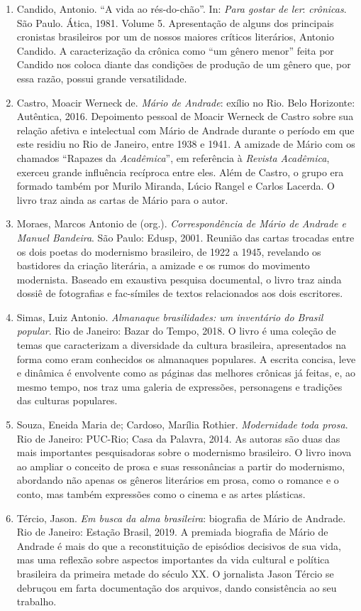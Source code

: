 \documentclass[12pt]{extarticle}
\begin{document}
\begin{enumerate}
\item
  Candido, Antonio. ``A vida ao rés-do-chão''. In: \emph{Para gostar de
  ler}: \emph{crônicas}. São Paulo. Ática, 1981. Volume 5. Apresentação
  de alguns dos principais cronistas brasileiros por um de nossos
  maiores críticos literários, Antonio Candido. A caracterização da
  crônica como ``um gênero menor'' feita por Candido nos coloca diante
  das condições de produção de um gênero que, por essa razão, possui
  grande versatilidade.
\item
  Castro, Moacir Werneck de. \emph{Mário de Andrade}: exílio no Rio.
  Belo Horizonte: Autêntica, 2016. Depoimento pessoal de Moacir Werneck
  de Castro sobre sua relação afetiva e intelectual com Mário de Andrade
  durante o período em que este residiu no Rio de Janeiro, entre 1938 e
  1941. A amizade de Mário com os chamados ``Rapazes da
  \emph{Acadêmica}'', em referência à \emph{Revista Acadêmica}, exerceu
  grande influência recíproca entre eles. Além de Castro, o grupo era
  formado também por Murilo Miranda, Lúcio Rangel e Carlos Lacerda. O
  livro traz ainda as cartas de Mário para o autor.
\item
  Moraes, Marcos Antonio de (org.). \emph{Correspondência de Mário de
  Andrade e Manuel Bandeira}. São Paulo: Edusp, 2001. Reunião das cartas
  trocadas entre os dois poetas do modernismo brasileiro, de 1922 a
  1945, revelando os bastidores da criação literária, a amizade e os
  rumos do movimento modernista. Baseado em exaustiva pesquisa
  documental, o livro traz ainda dossiê de fotografias e fac-símiles de
  textos relacionados aos dois escritores.
\item
  Simas, Luiz Antonio. \emph{Almanaque brasilidades: um inventário do
  Brasil popular}. Rio de Janeiro: Bazar do Tempo, 2018. O livro é uma
  coleção de temas que caracterizam a diversidade da cultura brasileira,
  apresentados na forma como eram conhecidos os almanaques populares. A
  escrita concisa, leve e dinâmica é envolvente como as páginas das
  melhores crônicas já feitas, e, ao mesmo tempo, nos traz uma galeria
  de expressões, personagens e tradições das culturas populares.
\item
  Souza, Eneida Maria de; Cardoso, Marília Rothier. \emph{Modernidade
  toda prosa}. Rio de Janeiro: PUC-Rio; Casa da Palavra, 2014. As
  autoras são duas das mais importantes pesquisadoras sobre o modernismo
  brasileiro. O livro inova ao ampliar o conceito de prosa e suas
  ressonâncias a partir do modernismo, abordando não apenas os gêneros
  literários em prosa, como o romance e o conto, mas também expressões
  como o cinema e as artes plásticas.
\item
  Tércio, Jason. \emph{Em busca da alma brasileira}: biografia de Mário
  de Andrade. Rio de Janeiro: Estação Brasil, 2019. A premiada biografia
  de Mário de Andrade é mais do que a reconstituição de episódios
  decisivos de sua vida, mas uma reflexão sobre aspectos importantes da
  vida cultural e política brasileira da primeira metade do século XX. O
  jornalista Jason Tércio se debruçou em farta documentação dos
  arquivos, dando consistência ao seu trabalho.
\end{enumerate}
\end{document}
